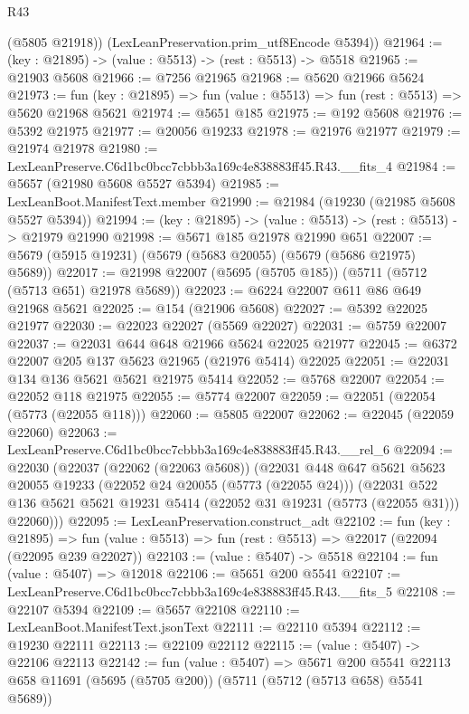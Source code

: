 \begin{lexlean}{R43}
\begin{coremodule}
        (@5805 @21918))
      (LexLeanPreservation.prim_utf8Encode @5394))
@21964 := (key : @21895) -> (value : @5513) -> (rest : @5513) -> @5518
@21965 := @21903 @5608
@21966 := @7256 @21965
@21968 := @5620 @21966 @5624
@21973 := fun (key : @21895) => fun (value : @5513) => fun (rest : @5513) => @5620 @21968 @5621
@21974 := @5651 @185
@21975 := @192 @5608
@21976 := @5392 @21975
@21977 := @20056 @19233
@21978 := @21976 @21977
@21979 := @21974 @21978
@21980 := LexLeanPreserve.C6d1bc0bcc7cbbb3a169c4e838883ff45.R43.__fits_4
@21984 := @5657 (@21980 @5608 @5527 @5394)
@21985 := LexLeanBoot.ManifestText.member
@21990 := @21984 (@19230 (@21985 @5608 @5527 @5394))
@21994 := (key : @21895) -> (value : @5513) -> (rest : @5513) -> @21979 @21990
@21998 := @5671 @185 @21978 @21990 @651
@22007 := @5679 (@5915 @19231) (@5679 (@5683 @20055) (@5679 (@5686 @21975) @5689))
@22017 := @21998 @22007 (@5695 (@5705 @185)) (@5711 (@5712 (@5713 @651) @21978 @5689))
@22023 := @6224 @22007 @611 @86 @649 @21968 @5621
@22025 := @154 (@21906 @5608)
@22027 := @5392 @22025 @21977
@22030 := @22023 @22027 (@5569 @22027)
@22031 := @5759 @22007
@22037 := @22031 @644 @648 @21966 @5624 @22025 @21977
@22045 := @6372 @22007 @205 @137 @5623 @21965 (@21976 @5414) @22025
@22051 := @22031 @134 @136 @5621 @5621 @21975 @5414
@22052 := @5768 @22007
@22054 := @22052 @118 @21975
@22055 := @5774 @22007
@22059 := @22051 (@22054 (@5773 (@22055 @118)))
@22060 := @5805 @22007
@22062 := @22045 (@22059 @22060)
@22063 := LexLeanPreserve.C6d1bc0bcc7cbbb3a169c4e838883ff45.R43.__rel_6
@22094 := @22030
    (@22037
      (@22062 (@22063 @5608))
      (@22031
        @448
        @647
        @5621
        @5623
        @20055
        @19233
        (@22052 @24 @20055 (@5773 (@22055 @24)))
        (@22031
          @522
          @136
          @5621
          @5621
          @19231
          @5414
          (@22052 @31 @19231 (@5773 (@22055 @31)))
          @22060)))
@22095 := LexLeanPreservation.construct_adt
@22102 := fun (key : @21895) =>
  fun (value : @5513) => fun (rest : @5513) => @22017 (@22094 (@22095 @239 @22027))
@22103 := (value : @5407) -> @5518
@22104 := fun (value : @5407) => @12018
@22106 := @5651 @200 @5541
@22107 := LexLeanPreserve.C6d1bc0bcc7cbbb3a169c4e838883ff45.R43.__fits_5
@22108 := @22107 @5394
@22109 := @5657 @22108
@22110 := LexLeanBoot.ManifestText.jsonText
@22111 := @22110 @5394
@22112 := @19230 @22111
@22113 := @22109 @22112
@22115 := (value : @5407) -> @22106 @22113
@22142 := fun (value : @5407) =>
  @5671
    @200
    @5541
    @22113
    @658
    @11691
    (@5695 (@5705 @200))
    (@5711 (@5712 (@5713 @658) @5541 @5689))

\end{coremodule}
\end{lexlean}
